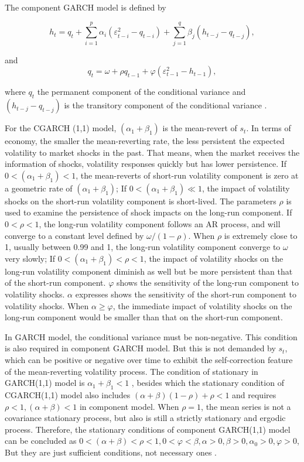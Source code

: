The component GARCH model is defined by

\begin{equation}
h_{t}=q_{t}+\sum_{i=1}^{p}\alpha_{i}(\varepsilon_{t-i}^{2}-q_{t-i}) + \sum_{j=1}^{q}\beta_{j}(h_{t-j}-q_{t-j}),
\end{equation}

and
\begin{equation}
q_{t} = \omega + \rho q_{t-1}  +\varphi(\varepsilon_{t-1}^{2}-h_{t-1}),
\end{equation}

where $q_{t}$ the permanent component of the conditional variance and $(h_{t-j}-q_{t-j})$ is the transitory component of the conditional variance \citep{0-19-829683-5,Ghalanos2011}. 

For the CGARCH (1,1) model, $(\alpha_1 +  \beta_1)$ is the mean-revert of $s_{t}$. In terms of economy, the smaller the mean-reverting rate, the less persistent the expected volatility to market shocks in the past. That means, when the market receives the information of shocks, volatility responses quickly but has lower persistence. If $0<(\alpha_1 +  \beta_1)<1$, the mean-reverts of short-run volatility component is zero at a geometric rate of  $(\alpha_1 +  \beta_1)$;  If $0<(\alpha_1 +  \beta_1)\ll1$, the impact of volatility shocks on the short-run volatility component is short-lived. The parameters $\rho$  is used to examine the persistence of shock impacts on the long-run component. If $0<\rho<1$,  the long-run volatility component follows an AR process, and will converge to a constant level defined by $\omega/(1-\rho)$. When  $\rho$ is extremely close to 1, usually between 0.99 and 1, the long-run volatility component converge to $\omega$ very slowly; If $0<(\alpha_1 +  \beta_1)<\rho<1$, the impact of volatility shocks on the long-run volatility component diminish as well but be more persistent than that of the short-run component. $\varphi$ shows the sensitivity of the  long-run component to volatility shocks. $\alpha$ expresses shows the sensitivity of the  short-run component to volatility shocks. When $\alpha\geq\varphi$, the immediate impact of volatility shocks on the long-run component would be smaller than that on the short-run component.

In GARCH model, the conditional variance must be non-negative. This condition is also required in component GARCH model. But this is not demanded by $s_{t}$, which can be positive or negative over time to exhibit the self-correction feature of the mean-reverting volatility process. The condition of stationary in GARCH(1,1) model is  $\alpha_{1} + \beta_{1}<1$ , besides which the stationary condition of CGARCH(1,1) model also includes $(\alpha + \beta)(1-\rho)+\rho<1$ and requires $\rho<1,(\alpha + \beta)<1$ in component model. When $\rho=1$, the mean series is not a covariance stationary process, but also is still a strictly stationary and ergodic process. Therefore, the stationary conditions of component GARCH(1,1) model can be concluded as $0<(\alpha + \beta)< \rho<1, 0<\varphi<\beta,\alpha>0,\beta>0,\alpha_{0}>0,\varphi>0$,  But they are just sufficient conditions, not necessary ones \citep{0-19-829683-5}.
   


